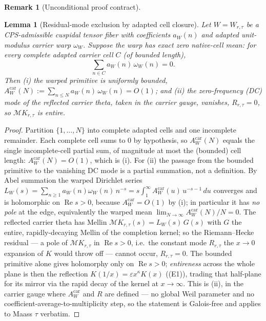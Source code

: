 \documentclass[11pt]{article}
\newtheorem{lemma}[theorem]{Lemma}
\theoremstyle{definition}
\newtheorem{remark}[theorem]{Remark}
\renewcommand{\Re}{\operatorname{Re}}
\begin{document}
\begin{remark}[Unconditional proof contract]
\begin{enumerate}
\begin{lemma}[Residual-mode exclusion by adapted cell closure]\label{lem:residual}
Let $W=W_{r,\tau}$ be a CPS-admissible cuspidal tensor fiber with coefficients $a_W(n)$ and adapted
unit-modulus carrier warp $\omega_W$. Suppose the warp has \emph{exact zero native-cell mean}: for every
complete adapted carrier cell $C$ (of bounded length),
\[
  \sum_{n\in C} a_W(n)\,\omega_W(n)=0 .
\]
Then \textup{(i)} the warped primitive is uniformly bounded,
$A^{\mathrm{car}}_W(N):=\sum_{n\le N} a_W(n)\,\omega_W(n)=O(1)$; and \textup{(ii)} the zero-frequency (DC)
mode of the reflected carrier theta, taken in the carrier gauge, vanishes, $R_{r,\tau}=0$, so
$\mathcal M K_{r,\tau}$ is entire.
\end{lemma}

\begin{proof}
Partition $\{1,\dots,N\}$ into complete adapted cells and one incomplete remainder. Each complete cell sums
to $0$ by hypothesis, so $A^{\mathrm{car}}_W(N)$ equals the single incomplete-cell partial sum, of magnitude
at most the (bounded) cell length: $A^{\mathrm{car}}_W(N)=O(1)$, which is \textup{(i)}. For \textup{(ii)} the
passage from the bounded primitive to the vanishing DC mode is a partial summation, not a definition. By Abel
summation the warped Dirichlet series
$L_W(s)=\sum_{n\ge1}a_W(n)\omega_W(n)\,n^{-s}=s\!\int_1^\infty A^{\mathrm{car}}_W(u)\,u^{-s-1}\,du$ converges and is
holomorphic on $\Re s>0$, because $A^{\mathrm{car}}_W=O(1)$ by \textup{(i)}; in particular it has \emph{no pole}
at the edge, equivalently the warped mean $\lim_{N\to\infty}A^{\mathrm{car}}_W(N)/N=0$. The reflected carrier
theta has Mellin $\mathcal M K_{r,\tau}(s)=L_W(s)\,G(s)$ with $G$ the entire, rapidly-decaying Mellin of the
completion kernel; so the Riemann--Hecke residual --- a pole of $\mathcal M K_{r,\tau}$ in $\Re s>0$, i.e.\ the
constant mode $R_{r,\tau}$ the $x\to0$ expansion of $K$ would throw off --- cannot occur, $R_{r,\tau}=0$. The
bounded primitive alone gives holomorphy only on $\Re s>0$; \emph{entireness} across the whole plane is then the
reflection $K(1/x)=\varepsilon x^{\kappa}K(x)$ (\textup{(E1)}), trading that half-plane for its mirror via the
rapid decay of the kernel at $x\to\infty$. This is \textup{(ii)}, in the carrier gauge where $A^{\mathrm{car}}_W$
and $R$ are defined --- no global Weil parameter and no coefficient-average-to-multiplicity step, so the
statement is Galois-free and applies to Maass $\tau$ verbatim.
\end{proof}


\end{enumerate}
\end{remark}
\end{document}
